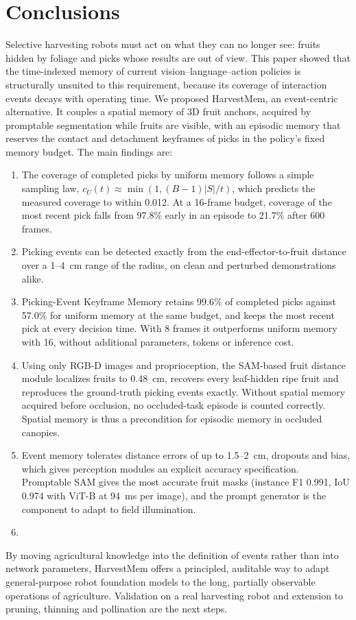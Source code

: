 \section{Conclusions}
\label{sec:conclusions}

Selective harvesting robots must act on what they can no longer see: fruits hidden by foliage and picks whose results are out of view. This paper showed that the time-indexed memory of current vision--language--action policies is structurally unsuited to this requirement, because its coverage of interaction events decays with operating time. We proposed HarvestMem, an event-centric alternative. It couples a spatial memory of 3D fruit anchors, acquired by promptable segmentation while fruits are visible, with an episodic memory that reserves the contact and detachment keyframes of picks in the policy's fixed memory budget. The main findings are:
\begin{enumerate}
\item The coverage of completed picks by uniform memory follows a simple sampling law, $c_U(t) \approx \min(1, (B-1)|S|/t)$, which predicts the measured coverage to within 0.012. At a 16-frame budget, coverage of the most recent pick falls from 97.8\% early in an episode to 21.7\% after 600 frames.
\item Picking events can be detected exactly from the end-effector-to-fruit distance over a 1--4~cm range of the radius, on clean and perturbed demonstrations alike.
\item Picking-Event Keyframe Memory retains 99.6\% of completed picks against 57.0\% for uniform memory at the same budget, and keeps the most recent pick at every decision time. With 8 frames it outperforms uniform memory with 16, without additional parameters, tokens or inference cost.
\item Using only RGB-D images and proprioception, the SAM-based fruit distance module localizes fruits to 0.48~cm, recovers every leaf-hidden ripe fruit and reproduces the ground-truth picking events exactly. Without spatial memory acquired before occlusion, no occluded-task episode is counted correctly. Spatial memory is thus a precondition for episodic memory in occluded canopies.
\item Event memory tolerates distance errors of up to 1.5--2~cm, dropouts and bias, which gives perception modules an explicit accuracy specification. Promptable SAM gives the most accurate fruit masks (instance F1 0.991, IoU 0.974 with ViT-B at 94~ms per image), and the prompt generator is the component to adapt to field illumination.
\item {}
\end{enumerate}
By moving agricultural knowledge into the definition of events rather than into network parameters, HarvestMem offers a principled, auditable way to adapt general-purpose robot foundation models to the long, partially observable operations of agriculture. Validation on a real harvesting robot and extension to pruning, thinning and pollination are the next steps.
